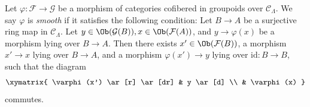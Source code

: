 \begin{definition}
\label{definition-smooth-morphism}
Let $\varphi : \mathcal{F} \to \mathcal{G}$ be a morphism of categories
cofibered in groupoids over $\mathcal{C}_\Lambda$.  We say  $\varphi$ is
{\it smooth} if it satisfies the following condition: Let $B \to A$ be
a surjective ring map in $\mathcal{C}_\Lambda$.  Let $y \in
\Ob(\mathcal{G}(B)), x \in \Ob(\mathcal{F}(A))$, and $y
\to \varphi(x)$ be a morphism lying over $B \to A$.  Then there
exists $x' \in \Ob(\mathcal{F}(B))$, a morphism $x' \to x$
lying over $B \to A$, and a morphism $\varphi(x') \to y$ lying
over $\text{id}: B \to B$, such that the diagram
$$
\xymatrix{
\varphi(x') \ar[r] \ar[dr] & y \ar[d] \\
& \varphi(x)
}
$$
commutes.
\end{definition}